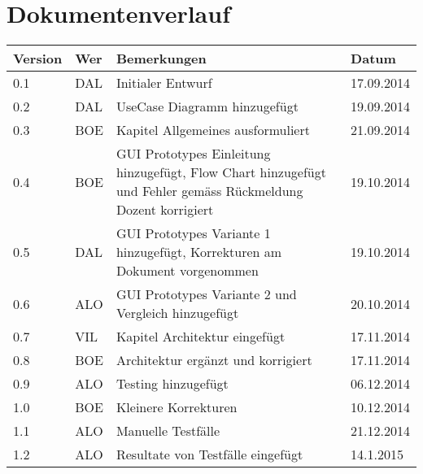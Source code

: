 \newpage
\section*{Dokumentenverlauf}
\begin{center}
	\begin{tabular}{  llp{9cm}l }
		\textbf{Version} & \textbf{Wer} & \textbf{Bemerkungen} & \textbf{Datum} \\\hline
		0.1 & DAL & Initialer Entwurf & 17.09.2014 \\
		0.2 & DAL & UseCase Diagramm hinzugefügt & 19.09.2014 \\
		0.3 & BOE & Kapitel Allgemeines ausformuliert & 21.09.2014 \\
		0.4 & BOE & GUI Prototypes Einleitung hinzugefügt, Flow Chart hinzugefügt und Fehler gemäss Rückmeldung Dozent korrigiert & 19.10.2014 \\
		0.5 & DAL & GUI Prototypes Variante 1 hinzugefügt, Korrekturen am Dokument vorgenommen & 19.10.2014 \\
		0.6 & ALO & GUI Prototypes Variante 2 und Vergleich hinzugefügt & 20.10.2014 \\
		0.7 & VIL & Kapitel Architektur eingefügt & 17.11.2014 \\
		0.8 & BOE & Architektur ergänzt und korrigiert & 17.11.2014 \\
		0.9 & ALO & Testing hinzugefügt & 06.12.2014 \\
		1.0 & BOE & Kleinere Korrekturen & 10.12.2014 \\
		1.1 & ALO & Manuelle Testfälle & 21.12.2014 \\
		1.2 & ALO & Resultate von Testfälle eingefügt & 14.1.2015 \\
	\end{tabular}
\end{center}
\newpage